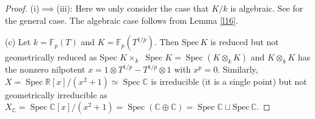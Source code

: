 \documentclass{amsart}
\theoremstyle{remark}\newtheorem{rmk}[theorem]{Remark}
\begin{document}
\begin{proof}
    (i)$\implies$(iii): Here we only consider the case that $K/k$ is algebraic. See \cite[\href{https://stacks.math.columbia.edu/tag/035U}{Tag 035U} Lemma 33.6.4]{stacks-project} for the general case. The algebraic case follows from Lemma \ref{l16}.
    
    (c) Let $k=\mathbb{F}_{p}(T)$ and $K=\mathbb{F}_{p}\left(T^{1 / p}\right)$. Then $\mathrm{Spec}\,K$ is reduced but not geometrically reduced as Spec $K \times_{k}$ $\operatorname{Spec} K=\operatorname{Spec}\left(K \otimes_{k} K\right)$ and $K \otimes_{k} K$ has the nonzero nilpotent $x=1 \otimes T^{1 / p}-T^{1 / p} \otimes 1$ with $x^{p}=0$. Similarly, $X=\operatorname{Spec} \mathbb{R}[x] /\left(x^{2}+1\right) \simeq \operatorname{Spec} \mathbb{C}$ is irreducible (it is a single point) but not geometrically irreducible as $X_{\mathbb{C}}=\operatorname{Spec} \mathbb{C}[x] /\left(x^{2}+1\right)=\operatorname{Spec}(\mathbb{C} \oplus \mathbb{C})=\operatorname{Spec} \mathbb{C}\sqcup\mathrm{Spec}\,\mathbb{C}$.
\end{proof}
\end{document}
